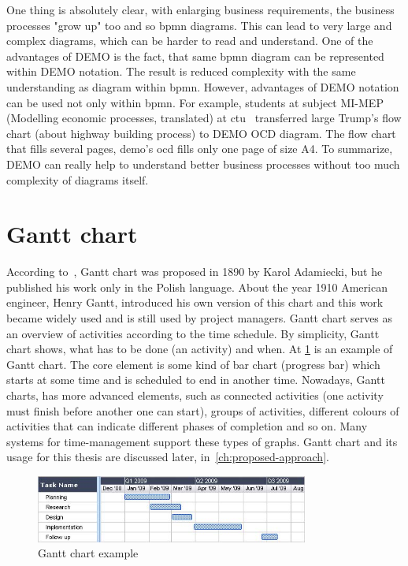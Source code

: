 One thing is absolutely clear, with enlarging business requirements, the business processes "grow up" too and so \gls{bpmn} diagrams. This can lead to very large and complex diagrams, which can be harder to read and understand. One of the advantages of DEMO is the fact, that same \gls{bpmn} diagram can be represented within DEMO notation. The result is reduced complexity with the same understanding as diagram within \gls{bpmn}. However, advantages of DEMO notation can be used not only within \gls{bpmn}. For example, students at subject MI-MEP (Modelling economic processes, translated) at \gls{ctu}~\cite{ccmi-2018} transferred large Trump's flow chart\cite{quartz-trump-2017} (about highway building process) to DEMO OCD diagram. The flow chart that fills several pages, \gls{demo}'s \gls{ocd} fills only one page of size A4. 
To summarize, DEMO can really help to understand better business processes without too much complexity of diagrams itself.
\section{Gantt chart}
According to~\cite{gantt-chart-2018}, Gantt chart was proposed in 1890 by Karol Adamiecki, but he published his work only in the Polish language. About the year 1910 American engineer, Henry Gantt, introduced his own version of this chart and this work became widely used and is still used by project managers. 
Gantt chart serves as an overview of activities according to the time schedule. By simplicity, Gantt chart shows, what has to be done (an activity) and when.
At \cref{fig:gantt-chart-example} is an example of Gantt chart. The core element is some kind of bar chart (progress bar) which starts at some time and is scheduled to end in another time.
Nowadays, Gantt charts, has more advanced elements, such as connected activities (one activity must finish before another one can start), groups of activities, different colours of activities that can indicate different phases of completion and so on. Many systems for time-management support these types of graphs.
Gantt chart and its usage for this thesis are discussed later, in~\cref{ch:proposed-approach}.

\begin{figure}[ht!]
	\centering
    \includegraphics[width=0.8\textwidth]{img/gantt-chart-example.jpg}
    \caption{Gantt chart example \cite{gantt-chart-2018}}
    \label{fig:gantt-chart-example}
\end{figure}

